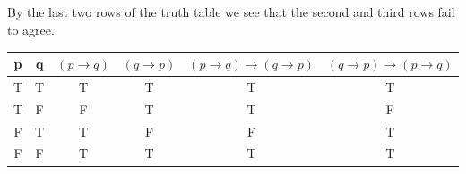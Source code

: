 \documentclass[11pt]{article}
\begin{document}
\subsection{} %
By the last two rows of the truth table we see that the second and third rows fail to agree.
\begin{center}
\begin{tabular}{ c|c|c|c|c|c } 
	p & q & $(p \rightarrow q)$ & $(q \rightarrow p)$ & $(p \rightarrow q) \rightarrow (q \rightarrow p)$ & $(q \rightarrow p) \rightarrow (p \rightarrow q)$ \\
	\hline
	T & T & T & T & T & T \\
	T & F & F & T & T & F \\
	F & T & T & F & F & T \\
	F & F & T & T & T & T \\
\end{tabular}
\end{center}

\section{} %
\end{document}
